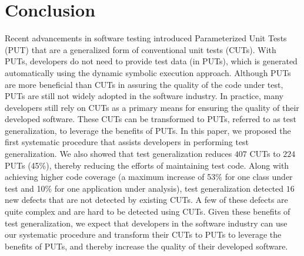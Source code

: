 \section{Conclusion}
\label{sec:conclusion}

Recent advancements in software testing introduced Parameterized Unit Tests (PUT) that are a generalized form of conventional unit tests (CUTs). With PUTs, developers do not need to provide test data (in PUTs), which is generated automatically using the dynamic symbolic execution approach. Although PUTs are more beneficial than CUTs in assuring the quality of the code under test, PUTs are still not widely adopted in the software industry. In practice, many developers still rely on CUTs as a primary means for ensuring the quality of their developed software. These CUTs can be transformed to PUTs, referred to as test generalization, to leverage the benefits of PUTs. In this paper, we proposed the first systematic procedure that assists developers in performing test generalization. We also showed that test generalization reduces $407$ CUTs to $224$ PUTs (45\%), thereby reducing the efforts of maintaining test code. Along with achieving higher code coverage (a maximum increase of 53\% for one class under test and 10\% for one application under analysis), test generalization detected $16$ new defects that are not detected by existing CUTs. A few of these defects are quite complex and are hard to be detected using CUTs. Given these benefits of test generalization, we expect that developers in the software industry can use our systematic procedure and transform their CUTs to PUTs to leverage the benefits of PUTs, and thereby increase the quality of their developed software.

